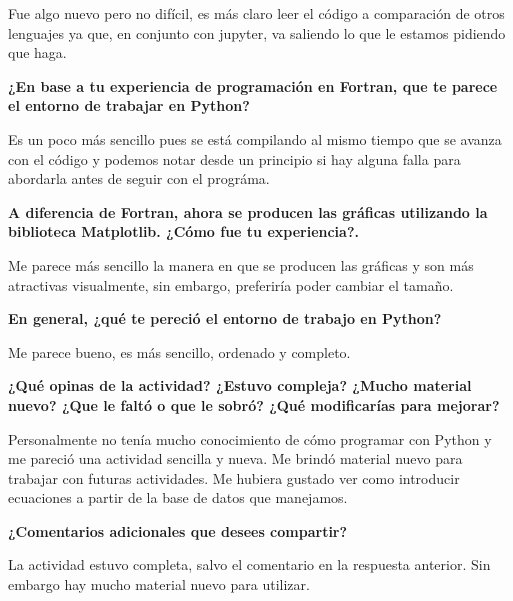 \documentclass[12pt]{article}
\begin{document}
Fue algo nuevo pero no difícil, es más claro leer el código a comparación de otros lenguajes ya que, en conjunto con jupyter, va saliendo lo que le estamos pidiendo que haga.

\textbf{¿En base a tu experiencia de programación en Fortran, que te parece el entorno de trabajar en Python?}

Es un poco más sencillo pues se está compilando al mismo tiempo que se avanza con el código y podemos notar desde un principio si hay alguna falla para abordarla antes de seguir con el prográma.

\textbf{A diferencia de Fortran, ahora se producen las gráficas utilizando la biblioteca Matplotlib. ¿Cómo fue tu experiencia?. }

Me parece más sencillo la manera en que se producen las gráficas y son más atractivas visualmente, sin embargo, preferiría poder cambiar el tamaño.

\textbf{En general, ¿qué te pereció el entorno de trabajo en Python? }

Me parece bueno, es más sencillo, ordenado y completo.

\textbf{¿Qué opinas de la actividad? ¿Estuvo compleja? ¿Mucho material nuevo? ¿Que le faltó o que le sobró? ¿Qué modificarías para mejorar? }

Personalmente no tenía mucho conocimiento de cómo programar con Python y me pareció una actividad sencilla y nueva. Me brindó material nuevo para trabajar con futuras actividades. Me hubiera gustado ver como introducir ecuaciones a partir de la base de datos que manejamos.

\textbf{¿Comentarios adicionales que desees compartir? }

La actividad estuvo completa, salvo el comentario en la respuesta anterior. Sin embargo hay mucho material nuevo para utilizar.
\end{document}
